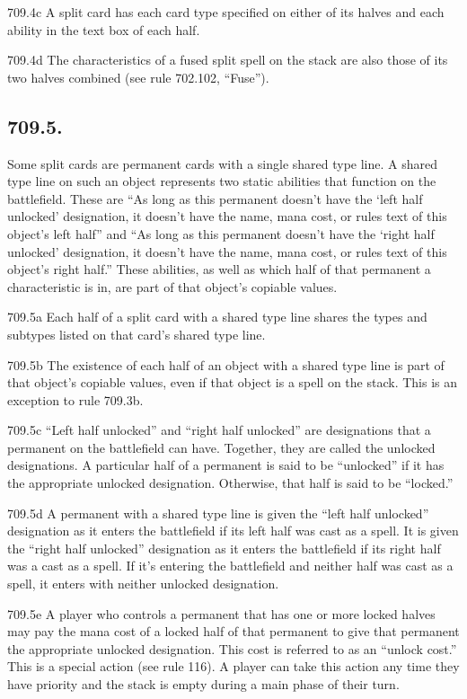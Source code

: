 709.4c A split card has each card type specified on either of its halves and each ability in the text box of each half.

709.4d The characteristics of a fused split spell on the stack are also those of its two halves combined (see rule 702.102, “Fuse”).

\subsection*{709.5.}
Some split cards are permanent cards with a single shared type line. A shared type line on such an object represents two static abilities that function on the battlefield. These are “As long as this permanent doesn’t have the ‘left half unlocked’ designation, it doesn’t have the name, mana cost, or rules text of this object’s left half” and “As long as this permanent doesn’t have the ‘right half unlocked’ designation, it doesn’t have the name, mana cost, or rules text of this object’s right half.” These abilities, as well as which half of that permanent a characteristic is in, are part of that object’s copiable values.

709.5a Each half of a split card with a shared type line shares the types and subtypes listed on that card’s shared type line.

709.5b The existence of each half of an object with a shared type line is part of that object’s copiable values, even if that object is a spell on the stack. This is an exception to rule 709.3b.

709.5c “Left half unlocked” and “right half unlocked” are designations that a permanent on the battlefield can have. Together, they are called the unlocked designations. A particular half of a permanent is said to be “unlocked” if it has the appropriate unlocked designation. Otherwise, that half is said to be “locked.”

709.5d A permanent with a shared type line is given the “left half unlocked” designation as it enters the battlefield if its left half was cast as a spell. It is given the “right half unlocked” designation as it enters the battlefield if its right half was a cast as a spell. If it’s entering the battlefield and neither half was cast as a spell, it enters with neither unlocked designation.

709.5e A player who controls a permanent that has one or more locked halves may pay the mana cost of a locked half of that permanent to give that permanent the appropriate unlocked designation. This cost is referred to as an “unlock cost.” This is a special action (see rule 116). A player can take this action any time they have priority and the stack is empty during a main phase of their turn.

